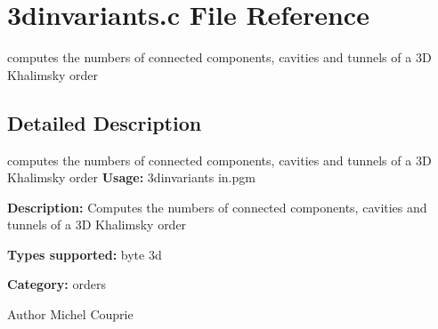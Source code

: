 \section{3dinvariants.c File Reference}
\label{3dinvariants_8c}


computes the numbers of connected components, cavities and tunnels of a 3D Khalimsky order  




\subsection{Detailed Description}
computes the numbers of connected components, cavities and tunnels of a 3D Khalimsky order {\bfseries Usage:} 3dinvariants in.pgm

{\bfseries Description:} Computes the numbers of connected components, cavities and tunnels of a 3D Khalimsky order

{\bfseries Types supported:} byte 3d

{\bfseries Category:} orders

\begin{DoxyAuthor}{Author}
Michel Couprie 
\end{DoxyAuthor}
